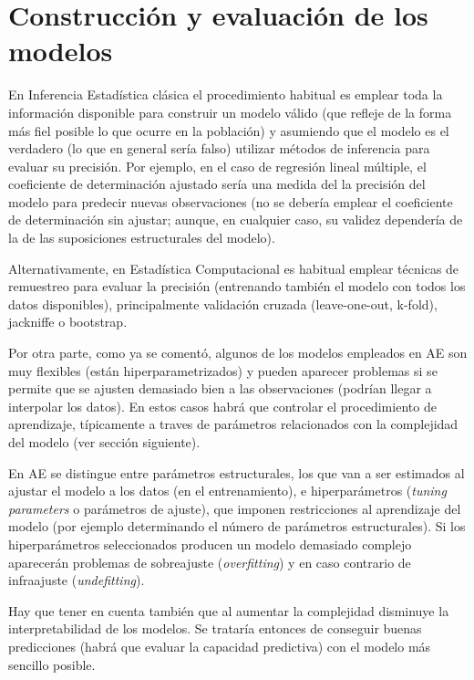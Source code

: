 \documentclass[
]{book}
\theoremstyle{break}
\theoremstyle{definition}
\theoremstyle{definition}
\theoremstyle{definition}
\theoremstyle{remark}
\begin{document}
\hypertarget{const-eval}{%
\section{Construcción y evaluación de los modelos}\label{const-eval}}

En Inferencia Estadística clásica el procedimiento habitual es emplear toda la información disponible para construir un modelo válido (que refleje de la forma más fiel posible lo que ocurre en la población) y asumiendo que el modelo es el verdadero (lo que en general sería falso) utilizar métodos de inferencia para evaluar su precisión.
Por ejemplo, en el caso de regresión lineal múltiple, el coeficiente de determinación ajustado sería una medida del la precisión del modelo para predecir nuevas observaciones (no se debería emplear el coeficiente de determinación sin ajustar; aunque, en cualquier caso, su validez dependería de la de las suposiciones estructurales del modelo).

Alternativamente, en Estadística Computacional es habitual emplear técnicas de remuestreo para evaluar la precisión (entrenando también el modelo con todos los datos disponibles), principalmente validación cruzada (leave-one-out, k-fold), jackniffe o bootstrap.

Por otra parte, como ya se comentó, algunos de los modelos empleados en AE son muy flexibles (están hiperparametrizados) y pueden aparecer problemas si se permite que se ajusten demasiado bien a las observaciones (podrían llegar a interpolar los datos).
En estos casos habrá que controlar el procedimiento de aprendizaje, típicamente a traves de parámetros relacionados con la complejidad del modelo (ver sección siguiente).

En AE se distingue entre parámetros estructurales, los que van a ser estimados al ajustar el modelo a los datos (en el entrenamiento), e hiperparámetros (\emph{tuning parameters} o parámetros de ajuste), que imponen restricciones al aprendizaje del modelo (por ejemplo determinando el número de parámetros estructurales).
Si los hiperparámetros seleccionados producen un modelo demasiado complejo aparecerán problemas de sobreajuste (\emph{overfitting}) y en caso contrario de infraajuste (\emph{undefitting}).

Hay que tener en cuenta también que al aumentar la complejidad disminuye la interpretabilidad de los modelos.
Se trataría entonces de conseguir buenas predicciones (habrá que evaluar la capacidad predictiva) con el modelo más sencillo posible.
\end{document}
